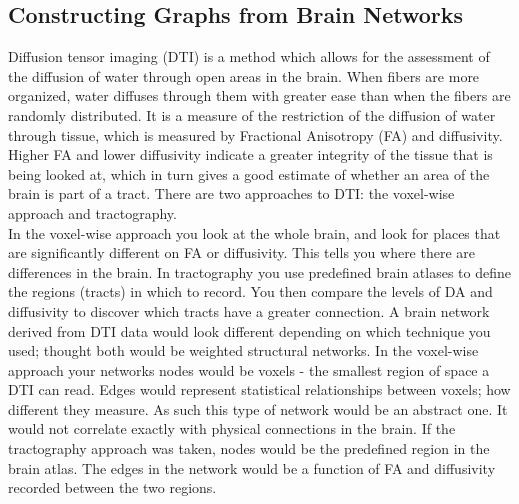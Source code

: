 \subsection{Constructing Graphs from Brain Networks}
	Diffusion tensor imaging (DTI) is a method which allows for the assessment of the diffusion of water through open areas in the brain. When fibers are more organized, water diffuses through them with greater ease than when the fibers are randomly distributed. It is a measure of the restriction of the diffusion of water through tissue, which is measured by Fractional Anisotropy (FA) and diffusivity. Higher FA and lower diffusivity indicate a greater integrity of the tissue that is being looked at, which in turn gives a good estimate of whether an area of the brain is part of a tract. There are two approaches to DTI: the voxel-wise approach and tractography.\\
	In the voxel-wise approach you look at the whole brain, and look for places that are significantly different on FA or diffusivity. This tells you where there are differences in the brain. 
	In tractography you use predefined brain atlases to define the regions (tracts) in which to record. You then compare the levels of DA and diffusivity to discover which tracts have a greater connection. A brain network derived from DTI data would look different depending on which technique you used; thought both would be weighted structural networks. In the voxel-wise approach your networks nodes would be voxels - the smallest region of space a DTI can read. Edges would represent statistical relationships between voxels; how different they measure. As such this type of network would be an abstract one. It would not correlate exactly with physical connections in the brain. If the tractography approach was taken, nodes would be the predefined region in the brain atlas. The edges in the network would be a function of FA and diffusivity recorded between the two regions. 
	
